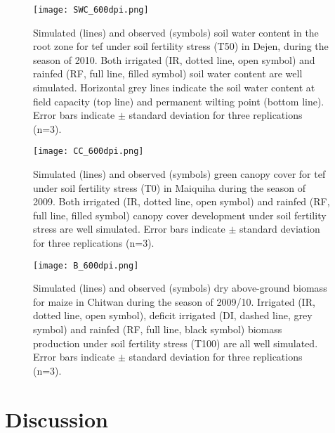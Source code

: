 \begin{figure}[tbhp]
	\centering
		\texttt{[image: SWC\_600dpi.png]}
	\caption{Simulated (lines) and observed (symbols) soil water content in the root zone for tef under soil fertility stress (T50) in Dejen, during the season of 2010. Both irrigated (IR, dotted line, open symbol) and rainfed (RF, full line, filled symbol) soil water content are well simulated. Horizontal grey lines indicate the soil water content at field capacity (top line) and permanent wilting point (bottom line). Error bars indicate $\pm$ standard deviation for three replications (n=3).}
	\label{fig:ch3_SWC}
\end{figure}
\begin{figure}[tbhp]
	\centering
		\texttt{[image: CC\_600dpi.png]}
	\caption{Simulated (lines) and observed (symbols) green canopy cover for tef under soil fertility stress (T0) in Maiquiha during the season of 2009. Both irrigated (IR, dotted line, open symbol) and rainfed (RF, full line, filled symbol) canopy cover development under soil fertility stress are well simulated. Error bars indicate $\pm$ standard deviation for three replications (n=3).}
	\label{fig:ch3_CC}
\end{figure}
\clearpage
\begin{figure}[tbhp]
	\centering
		\texttt{[image: B\_600dpi.png]}
	\caption{Simulated (lines) and observed (symbols) dry above-ground biomass for maize in Chitwan during the season of 2009/10. Irrigated (IR, dotted line, open symbol), deficit irrigated (DI, dashed line, grey symbol) and rainfed (RF, full line, black symbol) biomass production under soil fertility stress (T100) are all well simulated. Error bars indicate $\pm$ standard deviation for three replications (n=3).}
	\label{fig:ch3_B}
\end{figure}

\section{Discussion}
